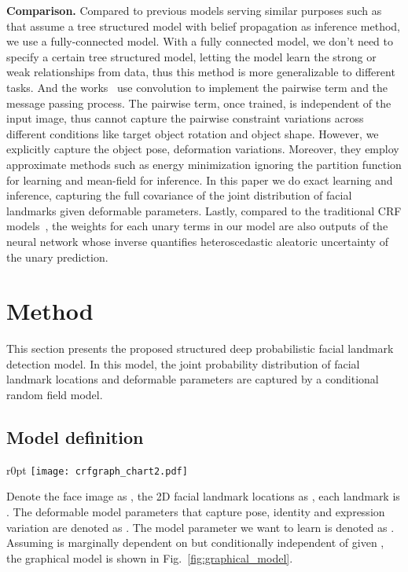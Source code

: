 \documentclass{article}
\begin{document}
\textbf{Comparison.}
  Compared to previous models serving similar purposes such as~\cite{chu2016structure-cnn-pose,chu2016hidden-crf-cnn-pose,wayne2018LAB} that assume a tree structured model with belief propagation as inference method, we use a fully-connected model. With a fully connected model, we don't need to specify a certain tree structured model, letting the model learn the strong or weak relationships from data, thus this method is more generalizable to different tasks.
  And the works~\cite{Tompson14heatmapPose,chu2016structure-cnn-pose,chu2016hidden-crf-cnn-pose,wayne2018LAB,Zheng2015CRFasRNN} use convolution to implement the pairwise term and the message passing process. The pairwise term, once trained, is independent of the input image, thus cannot capture the pairwise constraint variations across different conditions like target object rotation and object shape. However, we explicitly capture the object pose, deformation variations.
  Moreover, they employ approximate methods such as energy minimization ignoring the partition function for learning and mean-field for inference. In this paper we do exact learning and inference, capturing the full covariance of the joint distribution of facial landmarks given deformable parameters. Lastly, compared to the traditional CRF models~\cite{Radosavljevic2010CRFgaussian,Ristovski2013ContinuousCRF}, the weights for each unary terms in our model are also outputs of the neural network whose inverse quantifies heteroscedastic aleatoric uncertainty of the unary prediction.









\section{Method}

This section presents the proposed structured deep probabilistic facial landmark detection model. In this model, the joint probability distribution of facial landmark locations and deformable parameters are captured by a conditional random field model.

\subsection{Model definition} \label{sub:model}

\begin{wrapfigure}[15]{r}{0pt}
{
\texttt{[image: crfgraph\_chart2.pdf]}
}
  \caption{The graphical model. Dashed, dotted, solid lines represent dependencies between pairs of landmarks, landmark and deformable parameters, landmarks and face image, respectively.}
  \label{fig:graphical_model}
  \end{wrapfigure}
Denote the face image as , the 2D facial landmark locations as , each landmark is . The deformable model parameters that capture pose, identity and expression variation are denoted as . 
The model parameter we want to learn is denoted as . Assuming  is marginally dependent on  but conditionally independent of  given , the graphical model is shown in Fig.~\ref{fig:graphical_model}.
  
\end{document}
